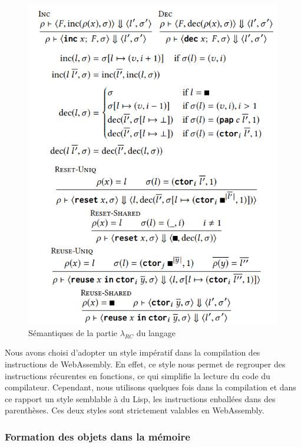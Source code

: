 \documentclass{rapportECL}
\begin{document}
\begin{figure}[hbt!]
	\centering
	\includegraphics[scale=0.80]{logos/semantics_rc.png}
	\caption{Sémantiques de la partie $\lambda_{RC}$ du langage}
	\label{fig:semantics_rc}
\end{figure}
\FloatBarrier 

Nous avons choisi d'adopter un style impératif dans la compilation des instructions de WebAssembly. En effet, ce style nous permet 
de regrouper des instructions récurentes en fonctions, ce qui simplifie la lecture du code du compilateur. Cependant, nous utilisons
quelques fois dans la compilation et dans ce rapport un style semblable à du Lisp, les instructions enballées dans des parenthèses.
Ces deux styles sont strictement valables en WebAssembly.

\subsubsection{Formation des objets dans la mémoire}
\end{document}
